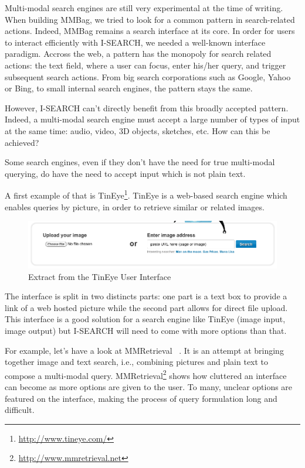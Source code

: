 \documentclass[runningheads,a4paper]{llncs}
\begin{document}
Multi-modal search engines are still very experimental at the time of writing. When building MMBag, we tried to look for a common pattern in search-related actions. Indeed, MMBag remains a search interface at its core. In order for users to interact efficiently with I-SEARCH, we needed a well-known interface paradigm. Accross the web, a pattern has the monopoly for search related actions:  the text field, where a user can focus, enter his/her query, and trigger subsequent search actions. From big search corporations such as Google, Yahoo or Bing, to small internal search engines, the pattern stays the same. 

However, I-SEARCH can't directly benefit from this broadly accepted pattern. Indeed, a multi-modal search engine must accept a large number of types of input at the same time: audio, video, 3D objects, sketches, etc. How can this be achieved?
 
Some search engines, even if they don't have the need for true multi-modal querying, do have the need to accept input which is not plain text.

A first example of that is TinEye\footnote{\url{http://www.tineye.com/}}. TinEye is a web-based search engine which enables queries by picture, in order to retrieve similar or related images. 
\begin{figure}[h!]
  \centering
    \includegraphics[width=0.8\linewidth]{resources/tineye-UI.png}
  \caption{Extract from the TinEye User Interface}
  \label{fig:tineye-ui}
\end{figure}

The interface is split in two distincts parts: one part is a text box to provide a link of a web hosted picture while the second part allows for direct file upload. This interface is a good solution for a search engine like TinEye (image input, image output) but I-SEARCH will need to come with more options than that.

 For example, let's have a look at MMRetrieval ~\cite{mmretrieval}. It is an attempt at bringing together image and text search, i.e., combining pictures and plain text to compose a multi-modal query. MMRetrieval\footnote{\url{http://www.mmretrieval.net}} shows how cluttered an interface can become as more options are given to the user. To many, unclear  options are featured on the interface, making the process of query formulation long and difficult.
\end{document}
